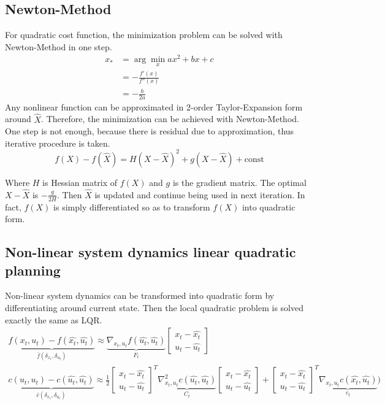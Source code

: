 \documentclass{article}
\begin{document}
\subsection{Newton-Method}
For quadratic cost function, the minimization problem can be solved with Newton-Method in one step.
\begin{align*}
    x_* &= \arg\min_{x}{ax^2 + bx + c}\\
    &= - \frac{f'(x)}{f''(x)}\\
    &= - \frac{b}{2a}
\end{align*}
Any nonlinear function can be approximated in 2-order Taylor-Expansion form around $\hat{X}$. Therefore, the minimization can be achieved with Newton-Method. One step is not enough, because there is residual due to approximation, thus iterative procedure is taken.
\begin{equation}
    f(X) - f(\hat{X}) = H(X - \hat{X})^2 + g(X - \hat{X}) + \text{const} \label{2_order-taylor_expansion}
\end{equation}

Where $H$ is Hessian matrix of $f(X)$ and $g$ is the gradient matrix. The optimal $X - \hat{X}$ is $- \frac{g}{2H}$. Then $\hat{X}$ is updated and continue being used in next iteration. In fact, $f(X)$ is simply differentiated so as to transform $f(X)$ into quadratic form.


\subsection{Non-linear system dynamics linear quadratic planning}
Non-linear system dynamics can be transformed into quadratic form by differentiating around current state. Then the local quadratic problem is solved exactly the same as LQR.
\begin{gather}
    \underbrace{f(x_t, u_t) - f(\hat{x_t}, \hat{u_t})}_{\bar{f}(\delta_{x_t}, \delta_{u_t})} \approx \underbrace{\nabla_{x_t, u_t} f(\hat{u_t}, \hat{u_t})}_{F_t} \begin{bmatrix}
        x_t - \hat{x_t} \\ u_t - \hat{u_t}
    \end{bmatrix} \label{diff-dynamics}\\
    \underbrace{c(u_t, u_t) - c(\hat{u_t}, \hat{u_t})}_{\bar{c}(\delta_{x_t}, \delta_{u_t})} \approx \frac{1}{2} \begin{bmatrix}
        x_t - \hat{x_t} \\ u_t - \hat{u_t}
    \end{bmatrix}^T \underbrace{\nabla_{x_t, u_t}^2 c(\hat{u_t}, \hat{u_t})}_{C_t} \begin{bmatrix}
        x_t - \hat{x_t} \\ u_t - \hat{u_t}
    \end{bmatrix} + \begin{bmatrix}
        x_t - \hat{x_t} \\ u_t - \hat{u_t}
    \end{bmatrix}^T \underbrace{\nabla_{x_t, u_t} c(\hat{x_t}, \hat{u_t})}_{c_t}) \label{diff-value}
\end{gather}
\end{document}
